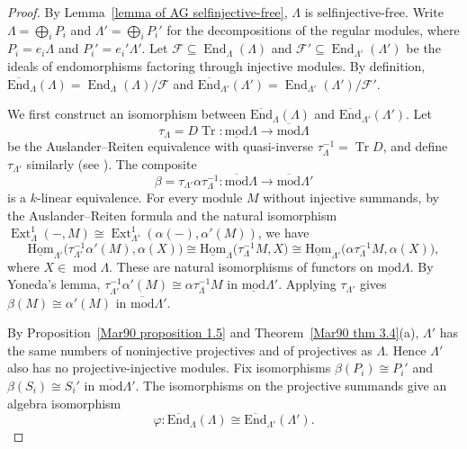 \documentclass[11pt]{article}
\newcommand{\End}{\operatorname{End}}
\newcommand{\Ext}{\operatorname{Ext}}
\renewcommand{\mod}{\operatorname{mod}}
\newcommand{\smod}{\operatorname{\underline{mod}}}
\newcommand{\sHom}{\operatorname{\underline{Hom}}}
\newcommand{\ismod}{\operatorname{\overline{mod}}}
\newcommand{\isEnd}{\operatorname{\overline{End}}}
\renewcommand{\cal}[1]{\mathcal #1}   %
\providecommand{\varLambda}{\Lambda}
\theoremstyle{definition}
\begin{document}
		\begin{proof}
			By Lemma~\ref{lemma of AG selfinjective-free}, $\varLambda$ is selfinjective-free.
			Write $\varLambda=\bigoplus_iP_i$ and $\varLambda'=\bigoplus_iP_i'$ for the decompositions of the regular modules, where $P_i=e_i\varLambda$ and $P_i'=e_i'\varLambda'$.
			Let $\cal{F}\subseteq\End_{\varLambda}(\varLambda)$ and $\cal{F}'\subseteq\End_{\varLambda'}(\varLambda')$ be the ideals of endomorphisms factoring through injective modules.
			By definition, $\isEnd_{\varLambda}(\varLambda)=\End_{\varLambda}(\varLambda)/\cal{F}$ and $\isEnd_{\varLambda'}(\varLambda')=\End_{\varLambda'}(\varLambda')/\cal{F}'$.

			We first construct an isomorphism between $\isEnd_{\varLambda}(\varLambda)$ and $\isEnd_{\varLambda'}(\varLambda')$.
			Let \[\tau_\varLambda=D\operatorname{Tr}\colon\smod\varLambda\to\ismod\varLambda\] be the Auslander--Reiten equivalence with quasi-inverse $\tau_\varLambda^{-1}=\operatorname{Tr}D$, and define $\tau_{\varLambda'}$ similarly (see \cite[Chapter~IV, Proposition~1.9]{ARS}).
			The composite
			\[
				\beta=\tau_{\varLambda'}\alpha\tau_\varLambda^{-1}\colon\ismod\varLambda\longrightarrow\ismod\varLambda'
			\]
			is a $k$-linear equivalence.
			For every module $M$ without injective summands, by the Auslander--Reiten formula and the natural isomorphism $\Ext^1_\varLambda(-,M)\cong\Ext^1_{\varLambda'}(\alpha(-),\alpha'(M))$, we have
			\[
				\sHom_{\varLambda'}\bigl(\tau_{\varLambda'}^{-1}\alpha'(M),\alpha(X)\bigr)
				\cong\sHom_\varLambda\bigl(\tau_\varLambda^{-1}M,X\bigr)\cong \sHom_{\varLambda'}\bigl(\alpha\tau_\varLambda^{-1}M,\alpha(X)\bigr),
			\]
			where $X\in \mod\varLambda$.
			These are natural isomorphisms of functors on $\smod\varLambda$.
			By Yoneda's lemma, $\tau_{\varLambda'}^{-1}\alpha'(M)\cong\alpha\tau_\varLambda^{-1}M$ in $\smod\varLambda'$.
			Applying $\tau_{\varLambda'}$ gives $\beta(M)\cong\alpha'(M)$ in $\ismod\varLambda'$.

			By Proposition~\ref{Mar90 proposition 1.5} and Theorem~\ref{Mar90 thm 3.4}(a), $\varLambda'$ has the same numbers of noninjective projectives and of projectives as $\varLambda$.
			Hence $\varLambda'$ also has no projective-injective modules.
			Fix isomorphisms $\beta(P_i)\cong P_i'$ and $\beta(S_i)\cong S_i'$ in $\ismod\varLambda'$.
			The isomorphisms on the projective summands give an algebra isomorphism
			\[
				\varphi\colon\isEnd_{\varLambda}(\varLambda)
				\cong\isEnd_{\varLambda'}(\varLambda').
			\]


\end{proof}
\end{document}

